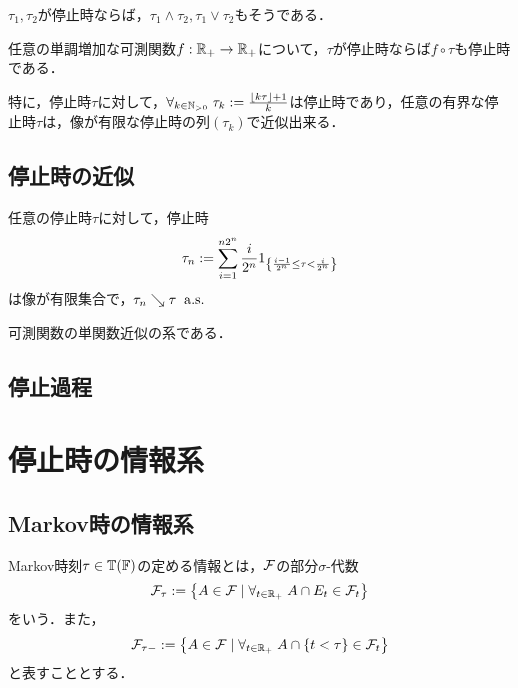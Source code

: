 \documentclass[uplatex,dvipdfmx]{jsreport}
\begin{document}
\begin{proposition}
    $\tau_1,\tau_2$が停止時ならば，$\tau_1\land\tau_2,\tau_1\lor\tau_2$もそうである．
\end{proposition}

\begin{proposition}
    任意の単調増加な可測関数$f:\mathbb{R}_+\to\mathbb{R}_+$について，$\tau$が停止時ならば$f\circ\tau$も停止時である．
\end{proposition}

\begin{corollary}
    特に，停止時$\tau$に対して，$\forall_{k\in\mathbb{N}_{>0}}\;\tau_k:=\frac{\lfloor k\tau\rfloor+1}{k}$は停止時であり，任意の有界な停止時$\tau$は，像が有限な停止時の列$(\tau_k)$で近似出来る．
\end{corollary}

\subsection{停止時の近似}

\begin{proposition}\label{prop-approximation-of-stopping-time-from-upwards}
    任意の停止時$\tau$に対して，停止時
    \[\tau_n:=\sum^{n2^n}_{i=1}\frac{i}{2^n}1_{\left\{\frac{i-1}{2^n}\le\tau<\frac{i}{2^n}\right\}}\]
    は像が有限集合で，$\tau_n\searrow\tau\;\;\mathrm{a.s.}$
\end{proposition}
\begin{remarks}
    可測関数の単関数近似の系である．
\end{remarks}

\subsection{停止過程}



\section{停止時の情報系}

\subsection{Markov時の情報系}

\begin{definition}
    Markov時刻$\tau\in\mathbb{T}(\mathbb{F})$の定める情報とは，$\mathcal{F}$の部分$\sigma$-代数
    \[\mathcal{F}_\tau:=\left\{A\in\mathcal{F}\mid\forall_{t\in\mathbb{R}_+}\;A\cap E_t\in\mathcal{F}_t\right\}\]
    をいう．また，
    \[\mathcal{F}_{\tau-}:=\left\{A\in\mathcal{F}\mid\forall_{t\in\mathbb{R}_+}\;A\cap\left\{t<\tau\right\}\in\mathcal{F}_t\right\}\]
    と表すこととする．
\end{definition}
\end{document}
